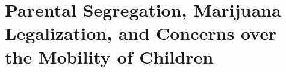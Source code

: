 \chapter{Parental Segregation, Marijuana Legalization, and Concerns over the Mobility of Children}






